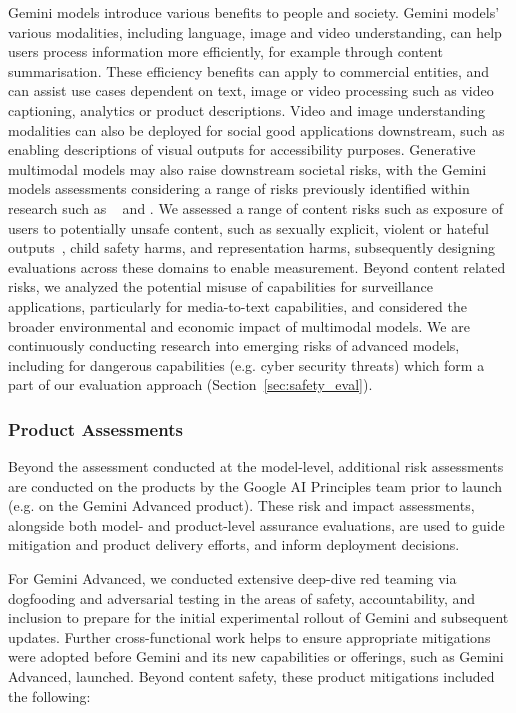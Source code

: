 Gemini models introduce various benefits to people and society. Gemini models’ various modalities, including language, image and video understanding, can help users process information more efficiently, for example through content summarisation. These efficiency benefits can apply to commercial entities, and can assist use cases dependent on text, image or video processing such as video captioning, analytics or product descriptions.  Video and image understanding modalities can also be deployed for social good applications downstream, such as enabling descriptions of visual outputs for accessibility purposes. Generative multimodal models may also raise downstream societal risks, with the Gemini models assessments considering a range of risks previously identified within research such as ~\citet{weidinger-2021-ethical} and \citet{shelby2023identifying}. We assessed a range of content risks such as exposure of users to potentially unsafe content, such as sexually explicit, violent or hateful outputs~\citep{weidinger-2021-ethical}, child safety harms, and representation harms, subsequently designing evaluations across these domains to enable measurement. Beyond content related risks, we analyzed the potential misuse of capabilities for surveillance applications, particularly for media-to-text capabilities, and considered the broader environmental and economic impact of multimodal models. We are continuously conducting research into emerging risks of advanced models, including for dangerous capabilities (e.g. cyber security threats) which form a part of our evaluation approach (Section~\ref{sec:safety_eval}).

\subsubsection{Product Assessments} 

Beyond the assessment conducted at the model-level, additional risk assessments are conducted on the products by the Google AI Principles team prior to launch (e.g. on the Gemini Advanced product). These risk and impact assessments, alongside both model- and product-level assurance evaluations, are used to guide mitigation and product delivery efforts, and inform deployment decisions.

For Gemini Advanced, we conducted extensive deep-dive red teaming via dogfooding and adversarial testing in the areas of safety, accountability, and inclusion to prepare for the initial experimental rollout of Gemini and subsequent updates. Further cross-functional work helps to ensure appropriate mitigations were adopted before Gemini and its new capabilities or offerings, such as Gemini Advanced, launched. Beyond content safety, these product mitigations included the following:

